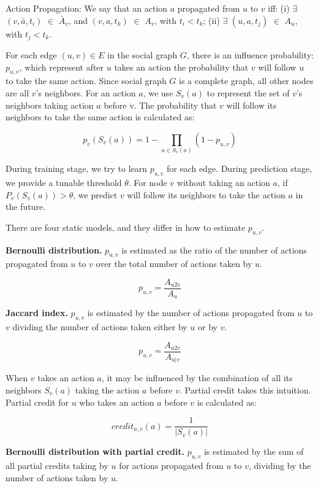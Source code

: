 \begin{definition}{Action Propagation:}
We say that an action $a$ propagated from $u$ to $v$ iff: (i) $\exists$ $(v, \bar{a}, t_i)$ $\in$ $\bar{A}_v$, 
and $(v, a, t_k)$ $\in$ $A_v$, with $t_i < t_k$; (ii) $\exists$ $(u, a, t_j)$ $\in$ $A_u$, with $t_j < t_k$. 
\end{definition}

For each edge $(u, v) \in E$ in the social graph $G$, 
there is an influence probability: $p_{u,v}$,
which represent after $u$ takes an action the probability that $v$ will follow $u$ to take the same action. 
Since social graph $G$ is a complete graph, 
all other nodes are all $v$'s neighbors. 
For an action $a$, we use $S_v(a)$ to represent the set of $v$'s neighbors taking action $a$ before v. 
The probability that $v$ will follow its neighbors to take the same action is calculated as:

$$p_v(S_v(a)) = 1 - \prod\limits_{u \in S_v(a)}(1 - p_{u,v})$$

During training stage, we try to learn $p_{u,v}$ for each edge. 
During prediction stage, we provide a tunable threshold $\theta$. 
For node $v$ without taking an action $a$, 
if $P_v(S_v(a))>\theta$, 
we predict $v$ will follow its neighbors to take the action $a$ in the future. 

There are four static models, and they differ in how to estimate $p_{u,v}$. 

{\bf Bernoulli distribution.} $p_{u,v}$ is estimated as the ratio of the number of actions 
propagated from $u$ to $v$ over the total number of actions taken by $u$.

$$p_{u,v} = \frac{A_{u2v}}{A_u}$$ 

{\bf Jaccard index.} 
$p_{u,v}$ is estimated by the number of actions propagated from $u$ to $v$ dividing 
the number of actions taken either by $u$ or by $v$.

$$p_{u,v} = \frac{A_{u2v}}{A_{u|v}}$$ 

When $v$ takes an action $a$, it may be influenced by the combination of all its neighbors $S_v(a)$ 
taking the action $a$ before $v$. Partial credit takes this intuition. 
Partial credit for $u$ who takes an action $a$ before $v$ is calculated as:

$$credit_{u,v}(a) = \frac{1}{|S_v(a)|}$$

{\bf Bernoulli distribution with partial credit.} 
$p_{u,v}$ is estimated by the sum of all partial credits taking by $u$ for actions propagated from $u$ to $v$, 
dividing by the number of actions taken by $u$. 


